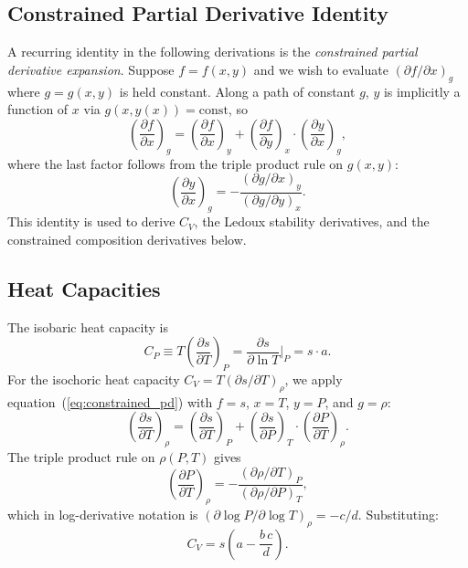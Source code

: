 \documentclass[twocolumn]{aastex701}
\begin{document}
\subsection{Constrained Partial Derivative Identity}\label{sec:constrained_pde}

A recurring identity in the following derivations is the \emph{constrained partial derivative expansion}.
Suppose $f = f(x, y)$ and we wish to evaluate $(\partial f/\partial x)_g$ where $g = g(x, y)$ is held constant.
Along a path of constant $g$, $y$ is implicitly a function of $x$ via $g(x, y(x)) = \text{const}$, so
\begin{equation}\label{eq:constrained_pd}
    \left(\frac{\partial f}{\partial x}\right)_{\!g}
    = \left(\frac{\partial f}{\partial x}\right)_{\!y}
    + \left(\frac{\partial f}{\partial y}\right)_{\!x}
    \cdot \left(\frac{\partial y}{\partial x}\right)_{\!g},
\end{equation}
where the last factor follows from the triple product rule on $g(x,y)$:
\begin{equation}
    \left(\frac{\partial y}{\partial x}\right)_{\!g} = -\frac{(\partial g/\partial x)_y}{(\partial g/\partial y)_x}.
\end{equation}
This identity is used to derive $C_V$, the Ledoux stability derivatives, and the constrained composition derivatives below.

\subsection{Heat Capacities}\label{sec:heat_cap_id}

The isobaric heat capacity is
\begin{equation}\label{eq:cp_identity}
    C_P \equiv T\left(\frac{\partial s}{\partial T}\right)_{\!P} = \frac{\partial s}{\partial \ln T}\bigg|_P = s \cdot a.
\end{equation}
For the isochoric heat capacity $C_V = T(\partial s/\partial T)_\rho$, we apply equation~(\ref{eq:constrained_pd}) with $f = s$, $x = T$, $y = P$, and $g = \rho$:
\begin{equation}
    \left(\frac{\partial s}{\partial T}\right)_{\!\rho}
    = \left(\frac{\partial s}{\partial T}\right)_{\!P}
    + \left(\frac{\partial s}{\partial P}\right)_{\!T}
    \cdot \left(\frac{\partial P}{\partial T}\right)_{\!\rho}.
\end{equation}
The triple product rule on $\rho(P,T)$ gives
\begin{equation}
    \left(\frac{\partial P}{\partial T}\right)_\rho = -\frac{(\partial\rho/\partial T)_P}{(\partial\rho/\partial P)_T},
\end{equation}
which in log-derivative notation is $(\partial\log P/\partial\log T)_\rho = -c/d$.
Substituting:
\begin{equation}\label{eq:cv_identity}
    C_V = s \left(a - \frac{b\,c}{d}\right).
\end{equation}
\end{document}
